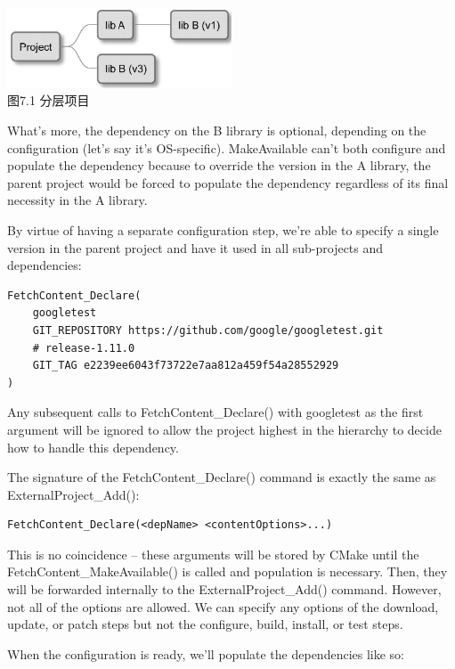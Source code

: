 \begin{center}
\includegraphics[width=0.5\textwidth]{content/2/chapter7/images/1.jpg}\\
图7.1 分层项目
\end{center}

What's more, the dependency on the B library is optional, depending on the configuration (let's say it's OS-specific). MakeAvailable can't both configure and populate the dependency because to override the version in the A library, the parent project would be forced to populate the dependency regardless of its final necessity in the A library.

By virtue of having a separate configuration step, we're able to specify a single version in the parent project and have it used in all sub-projects and dependencies:

\begin{lstlisting}[style=styleCMake]
FetchContent_Declare(
	googletest
	GIT_REPOSITORY https://github.com/google/googletest.git
	# release-1.11.0
	GIT_TAG e2239ee6043f73722e7aa812a459f54a28552929
)
\end{lstlisting} 

Any subsequent calls to FetchContent\_Declare() with googletest as the first argument will be ignored to allow the project highest in the hierarchy to decide how to handle this dependency.

The signature of the FetchContent\_Declare() command is exactly the same as ExternalProject\_Add():

\begin{lstlisting}[style=styleCMake]
FetchContent_Declare(<depName> <contentOptions>...)
\end{lstlisting} 

This is no coincidence – these arguments will be stored by CMake until the FetchContent\_MakeAvailable() is called and population is necessary. Then, they will be forwarded internally to the ExternalProject\_Add() command. However, not all of the options are allowed. We can specify any options of the download, update, or patch steps but not the configure, build, install, or test steps.

When the configuration is ready, we'll populate the dependencies like so:

